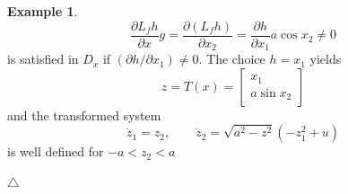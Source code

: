\documentclass[11pt,a4paper,oneside]{book}
\numberwithin{equation}{section}
\theoremstyle{it}
\theoremstyle{definition}
\newtheorem{example}{Example}[section]
\begin{document}
\begin{example}
\begin{equation*}
	\frac{\partial L_fh}{\partial x}g=\frac{\partial (L_fh)}{\partial x_2}=\frac{\partial h}{\partial x_1}a\cos x_2\ne0
\end{equation*}
is satisfied in $D_x$ if $(\partial h/\partial x_1)\ne0$. The choice $h=x_1$ yields
\begin{equation}
	z = T(x) = \begin{bmatrix} x_1 \\[6pt] a\sin x_2 \end{bmatrix}
\end{equation}
and the transformed system
\begin{equation}
	\dot{z}_1=z_2,\qquad\dot{z}_2=\sqrt{a^2-z^2}(-z_1^2+u)	
\end{equation}
			is well defined for $-a<z_2<a$
			
			\hfill$\triangle$
\end{example}
\end{document}
